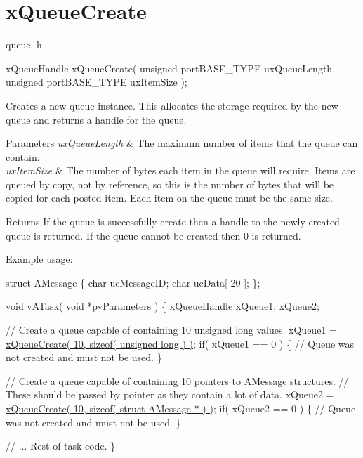 \hypertarget{group__xQueueCreate}{}\section{x\+Queue\+Create}
\label{group__xQueueCreate}
queue. h 
\begin{DoxyPre}
xQueueHandle xQueueCreate(
                          unsigned portBASE\_TYPE uxQueueLength,
                          unsigned portBASE\_TYPE uxItemSize
                      );
  \end{DoxyPre}


Creates a new queue instance. This allocates the storage required by the new queue and returns a handle for the queue.


\begin{DoxyParams}{Parameters}
{\em ux\+Queue\+Length} & The maximum number of items that the queue can contain.\\
\hline
{\em ux\+Item\+Size} & The number of bytes each item in the queue will require. Items are queued by copy, not by reference, so this is the number of bytes that will be copied for each posted item. Each item on the queue must be the same size.\\
\hline
\end{DoxyParams}
\begin{DoxyReturn}{Returns}
If the queue is successfully create then a handle to the newly created queue is returned. If the queue cannot be created then 0 is returned.
\end{DoxyReturn}
Example usage\+: 
\begin{DoxyPre}
struct AMessage
\{
   char ucMessageID;
   char ucData[ 20 ];
\};\end{DoxyPre}



\begin{DoxyPre}void vATask( void *pvParameters )
\{
xQueueHandle xQueue1, xQueue2;\end{DoxyPre}



\begin{DoxyPre}   // Create a queue capable of containing 10 unsigned long values.
   xQueue1 = \hyperlink{queue_8h_aeb858b824bd74a934ea7ebb81af2a6bb}{xQueueCreate( 10, sizeof( unsigned long ) )};
   if( xQueue1 == 0 )
   \{
    // Queue was not created and must not be used.
   \}\end{DoxyPre}



\begin{DoxyPre}   // Create a queue capable of containing 10 pointers to AMessage structures.
   // These should be passed by pointer as they contain a lot of data.
   xQueue2 = \hyperlink{queue_8h_aeb858b824bd74a934ea7ebb81af2a6bb}{xQueueCreate( 10, sizeof( struct AMessage * ) )};
   if( xQueue2 == 0 )
   \{
    // Queue was not created and must not be used.
   \}\end{DoxyPre}



\begin{DoxyPre}   // ... Rest of task code.
\}
\end{DoxyPre}
 